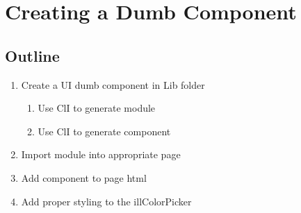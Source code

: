 \maketitle{}
\section{ Creating a Dumb Component }

\subsection {Outline}

\begin{enumerate}
  \item Create a UI dumb component in Lib folder
    \begin{enumerate}
      \item Use ClI to generate module
      \item Use ClI to generate component
    \end{enumerate}
  \item Import module into appropriate page
  \item Add component to page html
  \item Add proper styling to the illColorPicker
\end{enumerate}
